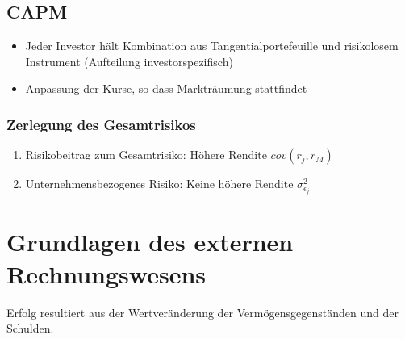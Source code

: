 \subsection{CAPM}
\begin{itemize}
	\item Jeder Investor hält Kombination aus Tangentialportefeuille und risikolosem Instrument (Aufteilung investorspezifisch)
	\item Anpassung der Kurse, so dass Markträumung stattfindet
\end{itemize}

\subsubsection{Zerlegung des Gesamtrisikos}
\begin{enumerate}
	\item Risikobeitrag zum Gesamtrisiko: Höhere Rendite \(cov(r_j,r_M)\)
	\item Unternehmensbezogenes Risiko: Keine höhere Rendite \(\sigma^2_{\epsilon_j}\)
\end{enumerate}



\section{Grundlagen des externen Rechnungswesens}
Erfolg resultiert aus der Wertveränderung der Vermögensgegenständen und der Schulden.

